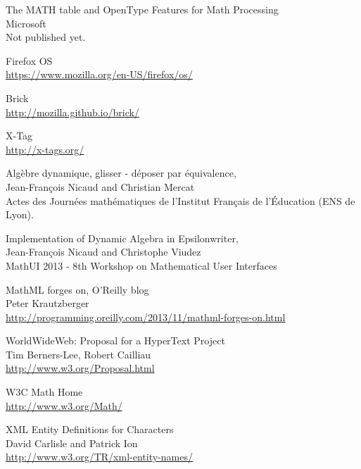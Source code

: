 \begin{thebibliography}{7}
The MATH table and OpenType Features for Math Processing \\
Microsoft \\
Not published yet.

Firefox OS \\
\href{https://www.mozilla.org/en-US/firefox/os/}{https://www.mozilla.org/en-US/firefox/os/}

Brick \\
\href{http://mozilla.github.io/brick/}{http://mozilla.github.io/brick/}

X-Tag \\
\href{http://x-tags.org/}{http://x-tags.org/}

Algèbre dynamique, glisser - déposer par équivalence, \\
Jean-François Nicaud and Christian Mercat \\
Actes des Journées mathématiques de l'Institut Français de l'Éducation (ENS de Lyon).

Implementation of Dynamic Algebra in Epsilonwriter, \\
Jean-François Nicaud and Christophe Viudez \\
MathUI 2013 - 8th Workshop on Mathematical User Interfaces

MathML forges on, O'Reilly blog \\
Peter Krautzberger \\
\href{http://programming.oreilly.com/2013/11/mathml-forges-on.html}{http://programming.oreilly.com/2013/11/mathml-forges-on.html}

WorldWideWeb: Proposal for a HyperText Project \\
Tim Berners-Lee, Robert Cailliau \\
\href{http://www.w3.org/Proposal.html}{http://www.w3.org/Proposal.html}

W3C Math Home \\
\href{http://www.w3.org/Math/}{http://www.w3.org/Math/}

XML Entity Definitions for Characters \\
David Carlisle and Patrick Ion \\
\href{http://www.w3.org/TR/xml-entity-names/}{http://www.w3.org/TR/xml-entity-names/}


\end{thebibliography}
